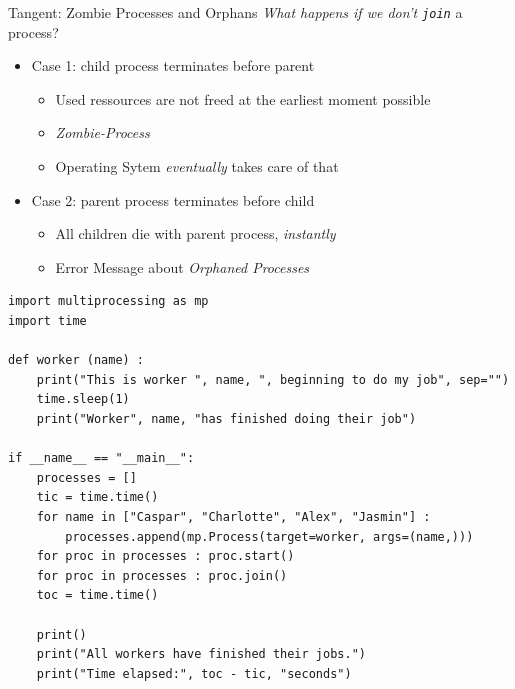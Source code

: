 \begin{frame}[fragile]{Tangent: Zombie Processes and Orphans}
%
\emph{What happens if we don't \texttt{join}} a process?

\vspace{6pt}
\begin{itemize}
\item Case 1: child process terminates before parent
	\begin{itemize}
	\item Used ressources are not freed at the earliest moment possible
	\item \emph{Zombie-Process}
	\item Operating Sytem \emph{eventually} takes care of that
	\end{itemize}
\item Case 2: parent process terminates before child
	\begin{itemize}
	\item All children die with parent process, \emph{instantly}
	\item Error Message about \emph{Orphaned Processes}
	\end{itemize}
\end{itemize}
%
\end{frame}


\begin{frame}[fragile]
%
\begin{codebox}
\begin{verbatim}
import multiprocessing as mp
import time

def worker (name) :
    print("This is worker ", name, ", beginning to do my job", sep="")
    time.sleep(1)
    print("Worker", name, "has finished doing their job")

if __name__ == "__main__":
    processes = []
    tic = time.time()
    for name in ["Caspar", "Charlotte", "Alex", "Jasmin"] :
        processes.append(mp.Process(target=worker, args=(name,)))
    for proc in processes : proc.start()
    for proc in processes : proc.join()
    toc = time.time()
    
    print()
    print("All workers have finished their jobs.")
    print("Time elapsed:", toc - tic, "seconds")
\end{verbatim}
\end{codebox}
%
\end{frame}

